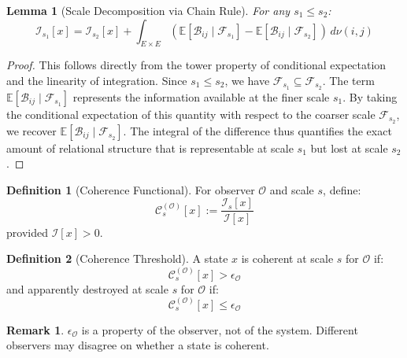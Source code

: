 \documentclass[12pt]{article}
\newtheorem{lemma}{Lemma}
\theoremstyle{definition}
\newtheorem{definition}{Definition}
\newtheorem{remark}{Remark}
\begin{document}
\begin{lemma}[Scale Decomposition via Chain Rule]
For any $s_1 \leq s_2$:
\begin{equation}
\mathcal{I}_{s_1}[x] = \mathcal{I}_{s_2}[x] + \int_{E \times E} \left( \mathbb{E}[\mathcal{B}_{ij} \mid \mathcal{F}_{s_1}] - \mathbb{E}[\mathcal{B}_{ij} \mid \mathcal{F}_{s_2}] \right) \, d\nu(i,j)
\end{equation}
\end{lemma}
\begin{proof}
This follows directly from the tower property of conditional expectation and the linearity of integration. Since $s_1 \leq s_2$, we have $\mathcal{F}_{s_1} \subseteq \mathcal{F}_{s_2}$. The term $\mathbb{E}[\mathcal{B}_{ij} \mid \mathcal{F}_{s_1}]$ represents the information available at the finer scale $s_1$. By taking the conditional expectation of this quantity with respect to the coarser scale $\mathcal{F}_{s_2}$, we recover $\mathbb{E}[\mathcal{B}_{ij} \mid \mathcal{F}_{s_2}]$. The integral of the difference thus quantifies the exact amount of relational structure that is representable at scale $s_1$ but lost at scale $s_2$.
\end{proof}

\begin{definition}[Coherence Functional]
For observer $\mathcal{O}$ and scale $s$, define:
\begin{equation}
\mathcal{C}_s^{(\mathcal{O})}[x] := \frac{\mathcal{I}_s[x]}{\mathcal{I}[x]}
\end{equation}
provided $\mathcal{I}[x] > 0$.
\end{definition}

\begin{definition}[Coherence Threshold]
A state $x$ is coherent at scale $s$ for $\mathcal{O}$ if:
\begin{equation}
\mathcal{C}_s^{(\mathcal{O})}[x] > \epsilon_{\mathcal{O}}
\end{equation}
and apparently destroyed at scale $s$ for $\mathcal{O}$ if:
\begin{equation}
\mathcal{C}_s^{(\mathcal{O})}[x] \leq \epsilon_{\mathcal{O}}
\end{equation}
\end{definition}

\begin{remark}
$\epsilon_{\mathcal{O}}$ is a property of the observer, not of the system. Different observers may disagree on whether a state is coherent.
\end{remark}
\end{document}

